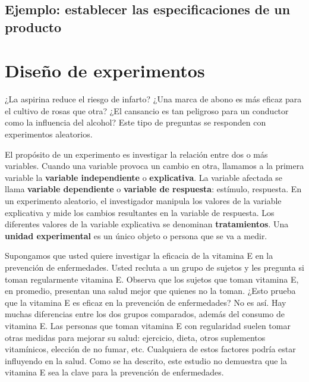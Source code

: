 \documentclass[
  letterpaper,
  DIV=11,
  numbers=noendperiod,
  oneside]{scrreprt}
\begin{document}
\hypertarget{ejemplo-establecer-las-especificaciones-de-un-producto}{%
\section{Ejemplo: establecer las especificaciones de un
producto}\label{ejemplo-establecer-las-especificaciones-de-un-producto}}


\hypertarget{diseuxf1o-de-experimentos}{%
\chapter{Diseño de experimentos}\label{diseuxf1o-de-experimentos}}

¿La aspirina reduce el riesgo de infarto? ¿Una marca de abono es más
eficaz para el cultivo de rosas que otra? ¿El cansancio es tan peligroso
para un conductor como la influencia del alcohol? Este tipo de preguntas
se responden con experimentos aleatorios.

El propósito de un experimento es investigar la relación entre dos o más
variables. Cuando una variable provoca un cambio en otra, llamamos a la
primera variable la \textbf{variable independiente} o
\textbf{explicativa}. La variable afectada se llama \textbf{variable
dependiente} o \textbf{variable de respuesta}: estímulo, respuesta. En
un experimento aleatorio, el investigador manipula los valores de la
variable explicativa y mide los cambios resultantes en la variable de
respuesta. Los diferentes valores de la variable explicativa se
denominan \textbf{tratamientos}. Una \textbf{unidad experimental} es un
único objeto o persona que se va a medir.

Supongamos que usted quiere investigar la eficacia de la vitamina E en
la prevención de enfermedades. Usted recluta a un grupo de sujetos y les
pregunta si toman regularmente vitamina E. Observa que los sujetos que
toman vitamina E, en promedio, presentan una salud mejor que quienes no
la toman. ¿Esto prueba que la vitamina E es eficaz en la prevención de
enfermedades? No es así. Hay muchas diferencias entre los dos grupos
comparados, además del consumo de vitamina E. Las personas que toman
vitamina E con regularidad suelen tomar otras medidas para mejorar su
salud: ejercicio, dieta, otros suplementos vitamínicos, elección de no
fumar, etc. Cualquiera de estos factores podría estar influyendo en la
salud. Como se ha descrito, este estudio no demuestra que la vitamina E
sea la clave para la prevención de enfermedades.
\end{document}
